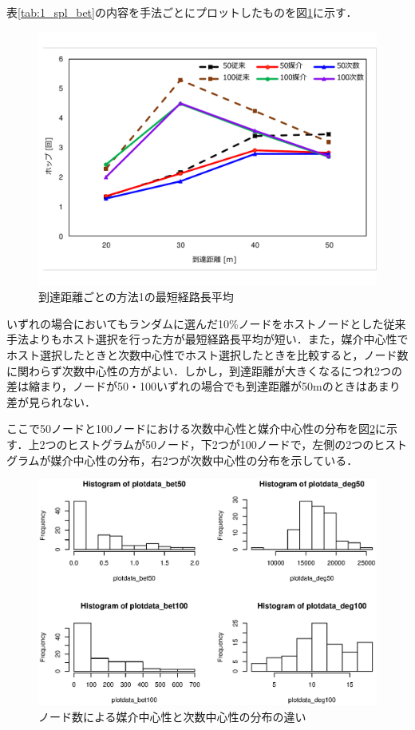 表\ref{tab:1_spl_bet}の内容を手法ごとにプロットしたものを図\ref{fig:1hopall}に示す．

\begin{figure}[H]
  \centering
  \includegraphics[width=1.05\textwidth]{figures/1spl.pdf}
  \caption{到達距離ごとの方法1の最短経路長平均}
  \label{fig:1hopall}
\end{figure}

いずれの場合においてもランダムに選んだ10\%ノードをホストノードとした従来手法よりもホスト選択を行った方が最短経路長平均が短い．また，媒介中心性でホスト選択したときと次数中心性でホスト選択したときを比較すると，ノード数に関わらず次数中心性の方がよい．しかし，到達距離が大きくなるにつれ2つの差は縮まり，ノードが50・100いずれの場合でも到達距離が50\si{\meter}のときはあまり差が見られない．

ここで50ノードと100ノードにおける次数中心性と媒介中心性の分布を図\ref{fig:50100bg}に示す．上2つのヒストグラムが50ノード，下2つが100ノードで，左側の2つのヒストグラムが媒介中心性の分布，右2つが次数中心性の分布を示している．

\begin{figure}[H]
  \centering
  \includegraphics[width=1\textwidth]{figures/50100bg.eps}
  \caption{ノード数による媒介中心性と次数中心性の分布の違い}
  \label{fig:50100bg}
\end{figure}


